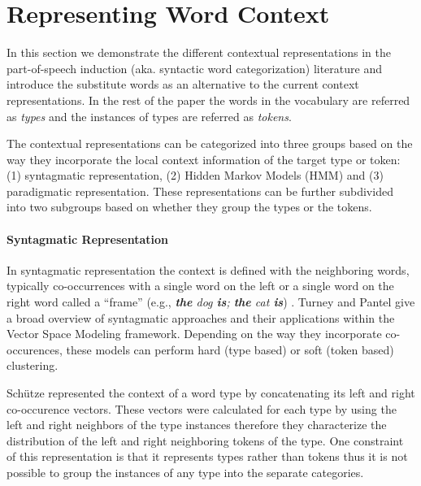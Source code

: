 \section{Representing Word Context}
\label{sec:representation}


In this section we demonstrate the different contextual
representations in the part-of-speech induction (aka. syntactic word
categorization) literature and introduce the substitute words as an
alternative to the current context representations.  In the rest of
the paper the words in the vocabulary are referred as {\em types} and
the instances of types are referred as {\em tokens}.

The contextual representations can be categorized into three groups
based on the way they incorporate the local context information of the
target type or token: (1) syntagmatic representation, (2) Hidden
Markov Models (HMM) and (3) paradigmatic representation.  These
representations can be further subdivided into two subgroups based on
whether they group the types or the tokens.

\paragraph{Syntagmatic Representation}

In syntagmatic representation the context is defined with the
neighboring words, typically co-occurrences with a single word on the
left or a single word on the right word called a ``frame'' (e.g., {\em
  {\bf the} dog {\bf is}; {\bf the} cat {\bf is}})
\cite{SchutzePe93,redington1998distributional,mintz2003frequent,20674613,lamar-EtAl:2010:Short,maron2010sphere}.
Turney and Pantel  give a
broad overview of syntagmatic approaches and their applications within
the Vector Space Modeling framework.  Depending on the way they
incorporate co-occurences, these models can perform hard (type based)
or soft (token based) clustering.

Sch\"{u}tze  represented the context of a word
type by concatenating its left and right co-occurence vectors.  These
vectors were calculated for each type by using the left and right
neighbors of the type instances therefore they characterize the
distribution of the left and right neighboring tokens of the type.
One constraint of this representation is that it represents types
rather than tokens thus it is not possible to group the instances of
any type into the separate categories.

